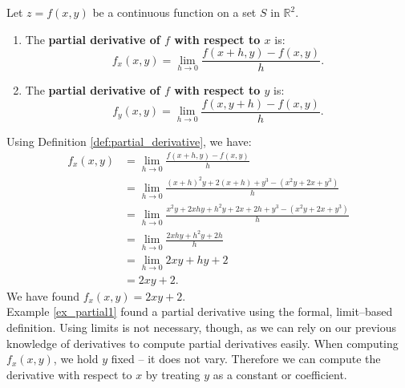 {Let $z=f(x,y)$ be a continuous function on a set $S$ in $\mathbb{R}^2$.
\begin{enumerate}
	\item The \textbf{partial derivative of $f$ with respect to $x$} is:
	$$f_x(x,y) = \lim_{h\to 0} \frac{f(x+h,y) - f(x,y)}h.$$
	\item The \textbf{partial derivative of $f$ with respect to $y$} is:
	$$f_y(x,y) = \lim_{h\to 0} \frac{f(x,y+h) - f(x,y)}h.$$
	
	\end{enumerate}
}

{Using Definition \ref{def:partial_derivative}, we have:
\begin{align*}
f_x(x,y) &= \lim_{h\to 0} \frac{f(x+h,y) - f(x,y)}{h} \\
				&= \lim_{h\to 0} \frac{(x+h)^2y+2(x+h)+y^3 - (x^2y+2x+y^3)}{h}\\
				&= \lim_{h\to 0} \frac{x^2y+2xhy+h^2y+2x+2h+y^3-(x^2y+2x+y^3)}{h}\\
				&= \lim_{h\to 0} \frac{2xhy+h^2y+2h}{h}\\
				&=\lim_{h\to 0} 2xy+hy+2\\
				&= 2xy+2.
\end{align*}
We have found $f_x(x,y) = 2xy+2$.
}\\

Example \ref{ex_partial1} found a partial derivative using the formal, limit--based definition. Using limits is not necessary, though, as we can rely on our previous knowledge of derivatives to compute partial derivatives easily. When computing $f_x(x,y)$, we hold $y$ fixed -- it does not vary. Therefore we can compute the derivative with respect to $x$ by treating $y$ as a constant or coefficient. 

